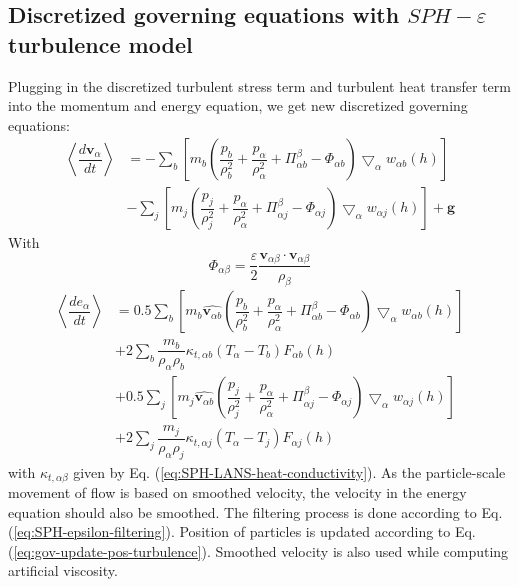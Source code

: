 \subsection{Discretized governing equations with $SPH-\varepsilon$ turbulence model}
Plugging in the discretized turbulent stress term and turbulent heat transfer term into the momentum and energy equation, we get new discretized governing equations:
\begin{equation}
\begin{split}
\left\langle\dfrac{d \textbf{v}_{\alpha}}{d t}\right\rangle
& =-\sum_b \left[ m_b \left(\dfrac{p_b}{\rho_b^2} + \dfrac{p_{\alpha}}{\rho_{\alpha}^2} + \Pi_{\alpha b}^{\beta} - \Phi_{\alpha b}\right) \bigtriangledown_{\alpha}w_{\alpha b}\left(h\right)\right] \\
& -\sum_j \left[m_j \left(\dfrac{p_j}{\rho_j^2} + \dfrac{p_{\alpha}}{\rho_{\alpha}^2} + \Pi_{\alpha j}^{\beta} - \Phi_{\alpha j}\right) \bigtriangledown_{\alpha}w_{\alpha j}\left(h\right)\right]
+\textbf{g} \label{eq:gov-sph-v}
\end{split}
\end{equation}
With 
\begin{equation}
\Phi_{\alpha \beta}=\dfrac{\varepsilon}{2} \dfrac{\textbf{v}_{\alpha \beta} \cdot \textbf{v}_{\alpha \beta}} {\rho_{\beta}} 
\end{equation}
\begin{equation}
\begin{split}
\left\langle\dfrac{d e_{\alpha}}{d t}\right\rangle
& = 0.5\sum_b \left[m_b \widehat{\textbf{v}_{\alpha b}}\left(\dfrac{p_b}{\rho_b^2} + \dfrac{p_{\alpha}}{\rho_{\alpha}^2} + \Pi_{\alpha b}^{\beta} - \Phi_{\alpha b}\right) \bigtriangledown_{\alpha}w_{\alpha b}\left(h\right)\right] \\
&+ 2 \sum_b \dfrac{m_b}{\rho_{\alpha} \rho_b} \kappa_{t,\alpha b} \left(T_{\alpha} - T_b\right) F_{\alpha b} \left(h\right) \\
& +0.5\sum_j \left[m_j \widehat{\textbf{v}_{\alpha b}}\left(\dfrac{p_j}{\rho_j^2} + \dfrac{p_{\alpha}}{\rho_{\alpha}^2} + \Pi_{\alpha j}^{\beta} - \Phi_{\alpha j}\right) \bigtriangledown_{\alpha}w_{\alpha j}\left(h\right)\right] \\
&+ 2 \sum_j \dfrac{m_j}{\rho_{\alpha} \rho_j} \kappa_{t,\alpha j} \left(T_{\alpha} - T_j\right) F_{\alpha j} \left(h\right)
\end{split}
\label{eq:gov-sph-e}
\end{equation}
with $\kappa_{t,\alpha \beta}$ given by Eq. (\ref{eq:SPH-LANS-heat-conductivity}). 
As the particle-scale movement of flow is based on smoothed velocity, the velocity in the energy equation should also be smoothed.
The filtering process is done according to Eq. (\ref{eq:SPH-epsilon-filtering}). Position of particles is updated according to Eq. (\ref{eq:gov-update-pos-turbulence}). Smoothed velocity is also used while computing artificial viscosity.

